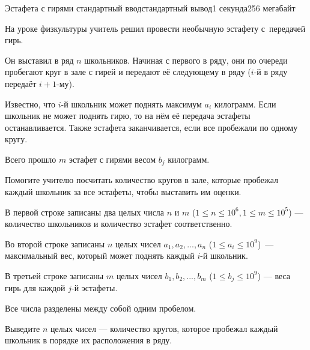 \begin{problem}[(Парников В.\,В.)]{Эстафета с гирями }{стандартный ввод}{стандартный вывод}{1 секунда}{256 мегабайт}

На уроке физкультуры учитель решил провести необычную эстафету с~передачей гирь.

Он выставил в ряд $n$ школьников. Начиная с первого в ряду, они по очереди пробегают круг в зале с гирей и передают её следующему в ряду ($i$-й в ряду передаёт $i+1$-му).

Известно, что $i$-й школьник может поднять максимум $a_i$ килограмм. Если школьник не может поднять гирю, то на нём её передача эстафеты останавливается. Также эстафета заканчивается, если все пробежали по одному кругу. 

Всего прошло $m$ эстафет с гирями весом $b_j$ килограмм.

Помогите учителю посчитать количество кругов в зале, которые пробежал каждый школьник за все эстафеты, чтобы выставить им оценки.

\InputFile
В первой строке записаны два целых числа $n$ и $m$ ($1 \leq n \leq 10^6, 1 \leq m \leq 10^5$) --- количество школьников и количество эстафет соответственно.

Во второй строке записаны $n$ целых чисел $a_1, a_2, ..., a_n$ ($1 \leq a_i \leq 10^9$)~--- максимальный вес, который может поднять каждый $i$-й школьник.

В третьей строке записаны $m$ целых чисел $b_1, b_2, ..., b_m$ ($1 \leq b_j \leq 10^9$) --- веса гирь для каждой $j$-й эстафеты.

Все числа разделены между собой одним пробелом.

\OutputFile
Выведите $n$ целых чисел --- количество кругов, которое пробежал каждый школьник в порядке их расположения в ряду.

\Example

\begin{example}
%
\end{example}

\end{problem}

